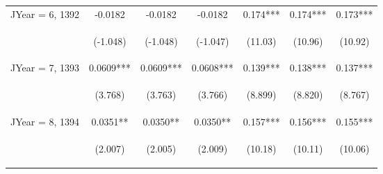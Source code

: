 \documentclass[]{article}
\begin{document}
\begin{center}
\begin{tabular}{lcccccc}
JYear = 6, 1392 & -0.0182 & -0.0182 & -0.0182 & 0.174*** & 0.174*** & 0.173*** \\
\vspace{4pt} & \begin{footnotesize}(-1.048)\end{footnotesize} & \begin{footnotesize}(-1.048)\end{footnotesize} & \begin{footnotesize}(-1.047)\end{footnotesize} & \begin{footnotesize}(11.03)\end{footnotesize} & \begin{footnotesize}(10.96)\end{footnotesize} & \begin{footnotesize}(10.92)\end{footnotesize} \\
JYear = 7, 1393 & 0.0609*** & 0.0609*** & 0.0608*** & 0.139*** & 0.138*** & 0.137*** \\
\vspace{4pt} & \begin{footnotesize}(3.768)\end{footnotesize} & \begin{footnotesize}(3.763)\end{footnotesize} & \begin{footnotesize}(3.766)\end{footnotesize} & \begin{footnotesize}(8.899)\end{footnotesize} & \begin{footnotesize}(8.820)\end{footnotesize} & \begin{footnotesize}(8.767)\end{footnotesize} \\
JYear = 8, 1394 & 0.0351** & 0.0350** & 0.0350** & 0.157*** & 0.156*** & 0.155*** \\
\vspace{4pt} & \begin{footnotesize}(2.007)\end{footnotesize} & \begin{footnotesize}(2.005)\end{footnotesize} & \begin{footnotesize}(2.009)\end{footnotesize} & \begin{footnotesize}(10.18)\end{footnotesize} & \begin{footnotesize}(10.11)\end{footnotesize} & \begin{footnotesize}(10.06)\end{footnotesize} \\

\end{tabular}
\end{center}
\end{document}
